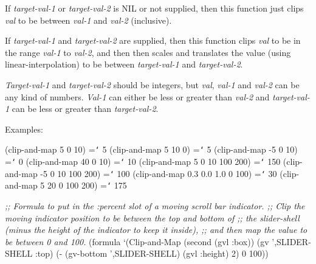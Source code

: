 If {\it target-val-1} or {\it target-val-2} is NIL or not supplied, then this
function just clips {\it val} to be between {\it val-1} and {\it val-2} (inclusive).

If {\it target-val-1} and {\it target-val-2} are supplied, then this function
clips {\it val} to be in the range {\it val-1} to {\it val-2}, and then
then scales and translates the value (using linear-interpolation) to be between
{\it target-val-1} and {\it target-val-2}.

{\it Target-val-1} and {\it target-val-2} should be integers, but {\it val},
{\it val-1} and {\it val-2} can be any kind of numbers.  {\it Val-1} can
either be less or greater than {\it val-2} and {\it target-val-1} can be less
or greater than {\it target-val-2}.

Examples:
\begin{programexample}
(clip-and-map 5 0 10) ={\tt\char`\>} 5
(clip-and-map 5 10 0) ={\tt\char`\>} 5
(clip-and-map -5 0 10) ={\tt\char`\>} 0
(clip-and-map 40 0 10) ={\tt\char`\>} 10
(clip-and-map 5 0 10 100 200) ={\tt\char`\>} 150
(clip-and-map -5 0 10 100 200) ={\tt\char`\>} 100
(clip-and-map 0.3 0.0 1.0 0 100) ={\tt\char`\>} 30
(clip-and-map 5 20 0 100 200) ={\tt\char`\>} 175

{\it ;; Formula to put in the :percent slot of a moving scroll bar indicator.
;; Clip the moving indicator position to be between the top and bottom of
;; the slider-shell (minus the height of the indicator to keep it inside),
;; and then map the value to be between 0 and 100.}
(formula `(Clip-and-Map (second (gvl :box))
			(gv ',SLIDER-SHELL :top)
			(- (gv-bottom ',SLIDER-SHELL) (gvl :height) 2)
			0 100))
\end{programexample}


